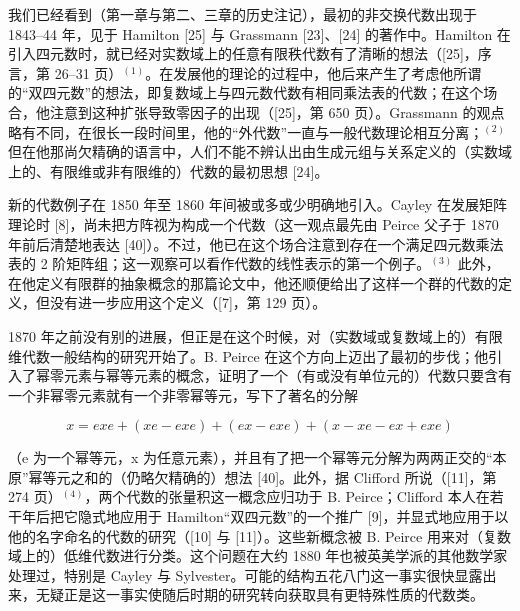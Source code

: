 \backmatter
{}

我们已经看到（第一章与第二、三章的历史注记），最初的非交换代数出现于 1843--44 年，见于 Hamilton {[}25{]} 与 Grassmann {[}23{]}、{[}24{]} 的著作中。Hamilton 在引入四元数时，就已经对实数域上的任意有限秩代数有了清晰的想法（{[}25{]}，序言，第 26--31 页）\(^{(1)}\)。在发展他的理论的过程中，他后来产生了考虑他所谓的“双四元数”的想法，即复数域上与四元数代数有相同乘法表的代数；在这个场合，他注意到这种扩张导致零因子的出现（{[}25{]}，第 650 页）。Grassmann 的观点略有不同，在很长一段时间里，他的“外代数”一直与一般代数理论相互分离；\(^{(2)}\) 但在他那尚欠精确的语言中，人们不能不辨认出由生成元组与关系定义的（实数域上的、有限维或非有限维的）代数的最初思想 {[}24{]}。

新的代数例子在 1850 年至 1860 年间被或多或少明确地引入。Cayley 在发展矩阵理论时 {[}8{]}，尚未把方阵视为构成一个代数（这一观点最先由 Peirce 父子于 1870 年前后清楚地表达 {[}40{]}）。不过，他已在这个场合注意到存在一个满足四元数乘法表的 2 阶矩阵组；这一观察可以看作代数的线性表示的第一个例子。\(^{(3)}\) 此外，在他定义有限群的抽象概念的那篇论文中，他还顺便给出了这样一个群的代数的定义，但没有进一步应用这个定义（{[}7{]}，第 129 页）。

1870 年之前没有别的进展，但正是在这个时候，对（实数域或复数域上的）有限维代数一般结构的研究开始了。B. Peirce 在这个方向上迈出了最初的步伐；他引入了幂零元素与幂等元素的概念，证明了一个（有或没有单位元的）代数只要含有一个非幂零元素就有一个非零幂等元，写下了著名的分解

\[
x = e x e + (x e - e x e) + (e x - e x e) + (x - x e - e x + e x e)
\]

（e 为一个幂等元，x 为任意元素），并且有了把一个幂等元分解为两两正交的“本原”幂等元之和的（仍略欠精确的）想法 {[}40{]}。此外，据 Clifford 所说（{[}11{]}，第 274 页）\(^{(4)}\)，两个代数的张量积这一概念应归功于 B. Peirce；Clifford 本人在若干年后把它隐式地应用于 Hamilton“双四元数”的一个推广 {[}9{]}，并显式地应用于以他的名字命名的代数的研究（{[}10{]} 与 {[}11{]}）。这些新概念被 B. Peirce 用来对（复数域上的）低维代数进行分类。这个问题在大约 1880 年也被英美学派的其他数学家处理过，特别是 Cayley 与 Sylvester。可能的结构五花八门这一事实很快显露出来，无疑正是这一事实使随后时期的研究转向获取具有更特殊性质的代数类。

